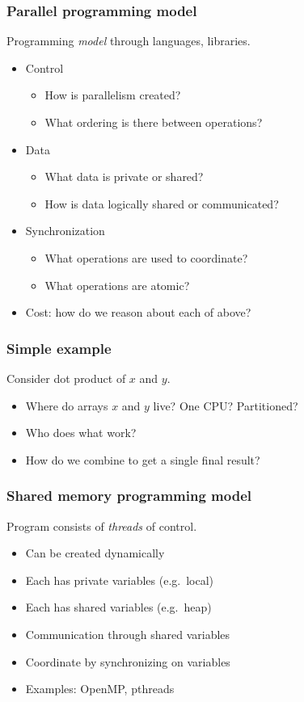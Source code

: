 \documentclass{beamer}
\begin{document}
\begin{frame}
  \frametitle{Parallel programming model}
  
  Programming {\em model} through languages, libraries.
  \begin{itemize}
  \item
    Control
    \begin{itemize}
      \item How is parallelism created?
      \item What ordering is there between operations?
    \end{itemize}
  \item
    Data
    \begin{itemize}
      \item What data is private or shared?
      \item How is data logically shared or communicated?
    \end{itemize}
  \item
    Synchronization
    \begin{itemize}
      \item What operations are used to coordinate?
      \item What operations are atomic?
    \end{itemize}
  \item
    Cost: how do we reason about each of above?
  \end{itemize}
\end{frame}


\begin{frame}
  \frametitle{Simple example}

  Consider dot product of $x$ and $y$.
  \begin{itemize}
    \item Where do arrays $x$ and $y$ live?  One CPU?  Partitioned?
    \item Who does what work?
    \item How do we combine to get a single final result?
  \end{itemize}
\end{frame}


\begin{frame}
  \frametitle{Shared memory programming model}
  
  Program consists of {\em threads} of control.
  \begin{itemize}
  \item Can be created dynamically
  \item Each has private variables (e.g.~local)
  \item Each has shared variables (e.g.~heap)
  \item Communication through shared variables
  \item Coordinate by synchronizing on variables
  \item Examples: OpenMP, pthreads
  \end{itemize}
\end{frame}
\end{document}
